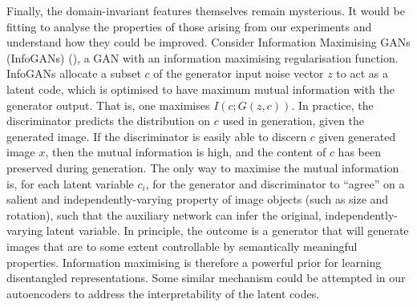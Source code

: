 Finally, the domain-invariant features themselves remain mysterious. It would be fitting to analyse the properties of those arising from our experiments and understand how they could be improved. Consider Information Maximising GANs (InfoGANs) (\cite{chen2016infogan}), a GAN with an information maximising regularisation function. InfoGANs allocate a subset $c$ of the generator input noise vector $z$ to act as a latent code, which is optimised to have maximum mutual information with the generator output. That is, one maximises $I(c ; G(z, c))$. In practice, the discriminator predicts the distribution on $c$ used in generation, given the generated image. If the discriminator is easily able to discern $c$ given generated image $x$, then the mutual information is high, and the content of $c$ has been preserved during generation. The only way to maximise the mutual information is, for each latent variable $c_i$, for the generator and discriminator to ``agree'' on a salient and independently-varying property of image objects (such as size and rotation), such that the auxiliary network can infer the original, independently-varying latent variable. In principle, the outcome is a generator that will generate images that are to some extent controllable by semantically meaningful properties. Information maximising is therefore a powerful prior for learning disentangled representations. Some similar mechanism could be attempted in our autoencoders to address the interpretability of the latent codes.

%
%
